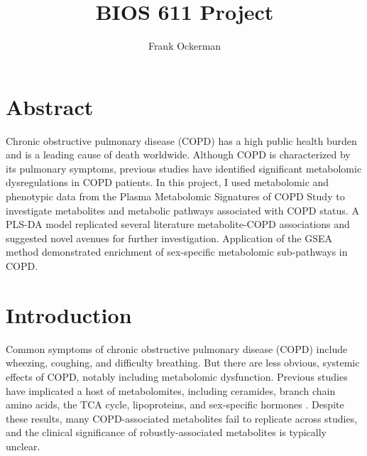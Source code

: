 \documentclass{article}
\begin{document}
\author{Frank Ockerman}
\title{BIOS 611 Project}
\maketitle
\tableofcontents

\section*{Abstract}
Chronic obstructive pulmonary disease (COPD) has a high public health burden and is a leading cause of death worldwide. Although COPD is characterized by its pulmonary symptoms, previous studies have identified significant metabolomic dysregulations in COPD patients. In this project, I used metabolomic and phenotypic data from the Plasma Metabolomic Signatures of COPD Study to investigate metabolites and metabolic pathways associated with COPD status. A PLS-DA model replicated several literature metabolite-COPD associations and suggested novel avenues for further investigation. Application of the GSEA method demonstrated enrichment of sex-specific metabolomic sub-pathways in COPD.


\section*{Introduction}
Common symptoms of chronic obstructive pulmonary disease (COPD) include wheezing, coughing, and difficulty breathing. But there are less obvious, systemic effects of COPD, notably including metabolomic dysfunction. Previous studies have implicated a host of metabolomites, including ceramides, branch chain amino acids, the TCA cycle, lipoproteins, and sex-specific hormones \cite{godboleMetabolomeFeaturesCOPD2022}\cite{tamRoleFemaleHormones2011}. Despite these results, many COPD-associated metabolites fail to replicate across studies, and the clinical significance of robustly-associated metabolites is typically unclear.
\end{document}
